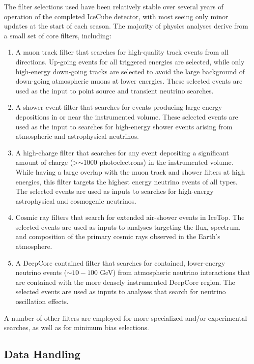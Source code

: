 The filter selections used have been relatively stable over several years
of operation of the completed IceCube detector, with most seeing only minor
updates at the 
start of each season.  The majority of physics analyses derive from a small
set of core filters, including:

\begin{enumerate}
\item A muon track filter that searches for high-quality track events from all
  directions.  Up-going events for all triggered energies are selected,
  while only high-energy 
  down-going tracks are selected to avoid the large background of
  down-going atmospheric muons at lower energies.  These selected events
  are used as the input to point source and transient neutrino searches.
\item A shower event filter that searches for events producing large energy
  depositions in or near the instrumented volume.  These selected events are
  used as the input to searches for high-energy shower events arising from
  atmospheric and astrophysical neutrinos.
\item A high-charge filter that searches for any event depositing a significant
  amount of charge (\textgreater $\sim$1000 photoelectrons) in the 
  instrumented volume.  While having a large overlap with the muon track
  and shower filters at high energies, this filter targets the highest
  energy neutrino events of all types. The selected events are used as
  inputs to searches for high-energy astrophysical and cosmogenic
  neutrinos.
\item Cosmic ray filters that search for extended air-shower events in
  IceTop.  The selected events are used as inputs to analyses 
  targeting the flux, spectrum, and composition of the primary cosmic rays
  observed in the Earth's atmosphere.
\item A DeepCore contained filter that searches for contained, lower-energy
  neutrino events ($\sim10-100$ GeV) from atmospheric neutrino interactions
  that are contained with the more densely instrumented DeepCore region.
  The selected events are used as inputs to analyses that search for
  neutrino oscillation effects.
\end{enumerate}

A number of other filters are employed for more specialized and/or
experimental searches, as well as for minimum bias selections.

\subsection{\label{sect:online_jade}Data Handling}

